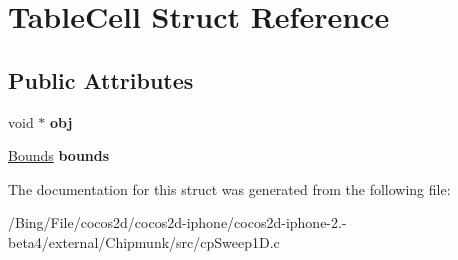 \hypertarget{struct_table_cell}{\section{Table\-Cell Struct Reference}
\label{struct_table_cell}
}
\subsection*{Public Attributes}
\begin{DoxyCompactItemize}
\item 
\hypertarget{struct_table_cell_aed07691a3ad6903e7cbfebbcd61eacbf}{void $\ast$ {\bfseries obj}}\label{struct_table_cell_aed07691a3ad6903e7cbfebbcd61eacbf}

\item 
\hypertarget{struct_table_cell_a7b6f4791e6baeb495197f82ebeced727}{\hyperlink{struct_bounds}{Bounds} {\bfseries bounds}}\label{struct_table_cell_a7b6f4791e6baeb495197f82ebeced727}

\end{DoxyCompactItemize}


The documentation for this struct was generated from the following file\-:\begin{DoxyCompactItemize}
\item 
/\-Bing/\-File/cocos2d/cocos2d-\/iphone/cocos2d-\/iphone-\/2.-\/beta4/external/\-Chipmunk/src/cp\-Sweep1\-D.\-c\end{DoxyCompactItemize}

